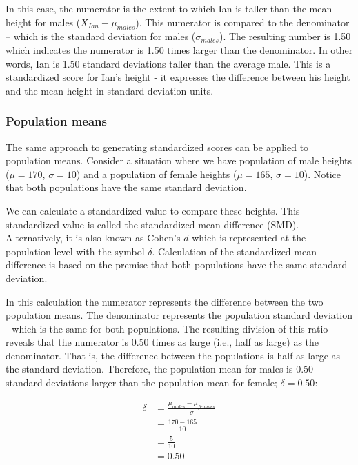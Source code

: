 \documentclass[
]{krantz}
\begin{document}
In this case, the numerator is the extent to which Ian is taller than the mean height for males (\(X_{Ian} - \mu_{males}\)). This numerator is compared to the denominator -- which is the standard deviation for males (\(\sigma_{males}\)). The resulting number is 1.50 which indicates the numerator is 1.50 times larger than the denominator. In other words, Ian is 1.50 standard deviations taller than the average male. This is a standardized score for Ian's height - it expresses the difference between his height and the mean height in standard deviation units.

\hypertarget{population-means}{%
\subsubsection{Population means}\label{population-means}}

The same approach to generating standardized scores can be applied to population means. Consider a situation where we have population of male heights (\(\mu = 170\), \(\sigma = 10\)) and a population of female heights (\(\mu = 165\), \(\sigma = 10\)). Notice that both populations have the same standard deviation.

We can calculate a standardized value to compare these heights. This standardized value is called the standardized mean difference (SMD). Alternatively, it is also known as Cohen's \(d\) which is represented at the population level with the symbol \(\delta\). Calculation of the standardized mean difference is based on the premise that both populations have the same standard deviation.

In this calculation the numerator represents the difference between the two population means. The denominator represents the population standard deviation - which is the same for both populations. The resulting division of this ratio reveals that the numerator is 0.50 times as large (i.e., half as large) as the denominator. That is, the difference between the populations is half as large as the standard deviation. Therefore, the population mean for males is 0.50 standard deviations larger than the population mean for female; \(\delta = 0.50\):

\[
\begin{aligned} 
\delta &=  \frac{\mu_{males} - \mu_{females}}{\sigma}\\ 
&=  \frac{170 - 165}{10}\\
&=  \frac{5}{10}\\
&= 0.50
\end{aligned} 
\]
\end{document}
